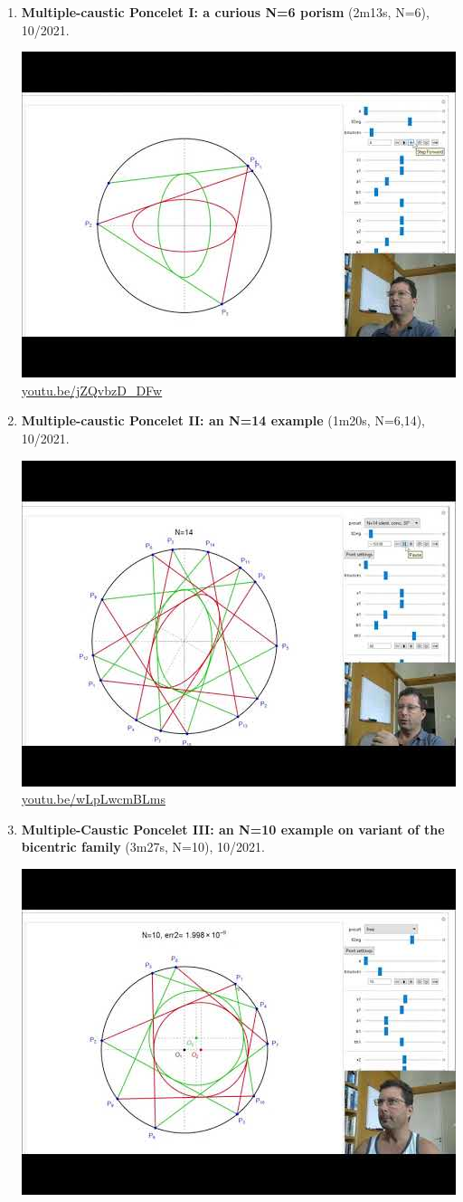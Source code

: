 \documentclass[12pt]{amsart}
\begin{document}
\begin{enumerate}[resume]
\item \textbf{Multiple-caustic Poncelet I: a curious N=6 porism} (2m13s, N=6), 10/2021. 
\begin{center}\includegraphics[width=.5\textwidth]{pics/jZQvbzD_DFw.jpg} \\ 
\href{https://youtu.be/jZQvbzD_DFw}{\url{youtu.be/jZQvbzD\_DFw}}\end{center}
% 
\item \textbf{Multiple-caustic Poncelet II: an N=14 example} (1m20s, N=6,14), 10/2021. 
\begin{center}\includegraphics[width=.5\textwidth]{pics/wLpLwcmBLms.jpg} \\ 
\href{https://youtu.be/wLpLwcmBLms}{\url{youtu.be/wLpLwcmBLms}}\end{center}
% 
\item \textbf{Multiple-Caustic Poncelet III: an N=10 example on variant of the bicentric family} (3m27s, N=10), 10/2021. 
\begin{center}\includegraphics[width=.5\textwidth]{pics/iN9RreO6ONA.jpg} \\ 

\end{center}
\end{enumerate}
\end{document}
